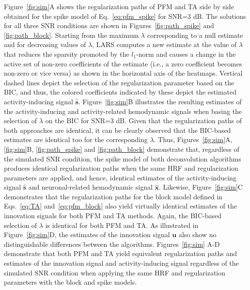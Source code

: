 Figure~\ref{fig:sim}A shows the regularization paths of PFM and TA side by side
obtained for the spike model of Eq.~\eqref{eq:pfm_spike} for SNR=3 dB. The
solutions for all three SNR conditions are shown in Figures~\ref{fig:path_spike}
and \ref{fig:path_block}. Starting from the maximum $\lambda$ corresponding to a
null estimate and for decreasing values of $\lambda$, LARS computes a new
estimate at the value of $\lambda$ that reduces the sparsity promoted by the
\(l_1\)-norm and causes a change in the active set of non-zero coefficients of
the estimate (i.e., a zero coefficient becomes non-zero or vice versa) as shown
in the horizontal axis of the heatmaps. Vertical dashed lines depict the
selection of the regularization parameter based on the BIC, and thus, the
colored coefficients indicated by these depict the estimated activity-inducing
signal $\mathbf{\hat{{s}}}$. Figure~\ref{fig:sim}B illustrates the resulting
estimates of the activity-inducing and activity-related hemodynamic signals when
basing the selection of $\lambda$ on the BIC for SNR=3 dB. Given that the
regularization paths of both approaches are identical, it can be clearly
observed that the BIC-based estimates are identical too for the corresponding
$\lambda$. Thus, Figures~\ref{fig:sim}A, \ref{fig:sim}B, \ref{fig:path_spike}
and \ref{fig:path_block} demonstrate that, regardless of the simulated SNR
condition, the spike model of both deconvolution algorithms produces identical
regularization paths when the same HRF and regularization parameters are
applied, and hence, identical estimates of the activity-inducing signal
$\mathbf{\hat{{s}}}$ and neuronal-related hemodynamic signal
$\mathbf{\hat{{x}}}$. Likewise, Figure~\ref{fig:sim}C demonstrates that the
regularization paths for the block model defined in Eqs.~\eqref{eq:TA}
and~\eqref{eq:pfm_block} also yield virtually identical estimates of the
innovation signals for both PFM and TA methods. Again, the BIC-based selection
of $\lambda$ is identical for both PFM and TA. As illustrated in
Figure~\ref{fig:sim}D, the estimates of the innovation signal $\mathbf{u}$ also
show no distinguishable differences between the algorithms. %
Figures~\ref{fig:sim} A-D demonstrate that both PFM and TA yield equivalent
regularization paths and estimates of the innovation signal and
activity-inducing signal regardless of the simulated SNR condition when applying
the same HRF and regularization parameters with the block and spike
models.

